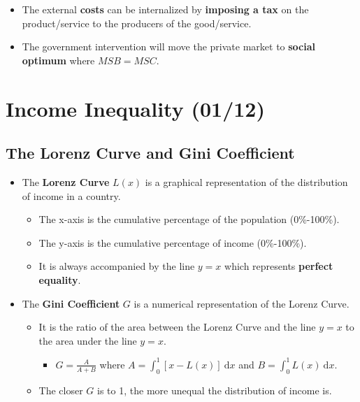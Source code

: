 \documentclass[
  letterpaper,
  DIV=11,
  numbers=noendperiod]{scrartcl}
\providecommand{\tightlist}{%
  \setlength{\itemsep}{0pt}\setlength{\parskip}{0pt}}\usepackage{longtable,booktabs,array}
\begin{document}
\begin{itemize}
\tightlist
\item
  The external \textbf{costs} can be internalized by \textbf{imposing a
  tax} on the product/service to the producers of the good/service.
\item
  The government intervention will move the private market to
  \textbf{social optimum} where \(MSB = MSC\).
\end{itemize}

\newpage{}

\section{Income Inequality (01/12)}\label{income-inequality-0112}

\subsection{The Lorenz Curve and Gini
Coefficient}\label{the-lorenz-curve-and-gini-coefficient}

\begin{itemize}
\tightlist
\item
  The \textbf{Lorenz Curve} \(L(x)\) is a graphical representation of
  the distribution of income in a country.

  \begin{itemize}
  \tightlist
  \item
    The x-axis is the cumulative percentage of the population
    (0\%-100\%).
  \item
    The y-axis is the cumulative percentage of income (0\%-100\%).
  \item
    It is always accompanied by the line \(y=x\) which represents
    \textbf{perfect equality}.
  \end{itemize}
\item
  The \textbf{Gini Coefficient} \(G\) is a numerical representation of
  the Lorenz Curve.

  \begin{itemize}
  \tightlist
  \item
    It is the ratio of the area between the Lorenz Curve and the line
    \(y=x\) to the area under the line \(y=x\).

    \begin{itemize}
    \tightlist
    \item
      \(G = \frac{A}{A+B}\) where
      \(A = \int_{0}^{1} \left[x-L(x)\right] \ \mathrm{d}x\) and
      \(B = \int_{0}^{1}L(x) \ \mathrm{d}x\).
    \end{itemize}
  \item
    The closer \(G\) is to 1, the more unequal the distribution of
    income is.
  \end{itemize}
\end{itemize}
\end{document}
